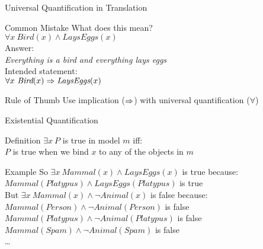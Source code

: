 \documentclass[14pt]{beamer}
\begin{document}
\begin{frame}{Universal Quantification in Translation}
	\begin{block}{Common Mistake}
		What does this mean? \\
		\tab$\forall x\ \textit{Bird}(x) \land \textit{LaysEggs}(x)$ \\
		\pause
		Answer: \\
		\tab\emph{Everything is a bird and everything lays eggs} \\
		Intended statement: \\
		\tab$\forall x\ \textit{Bird}(x) \Rightarrow \textit{LaysEggs}(x)$ \\
	\end{block}
	\pause
	\begin{block}{Rule of Thumb}
		Use implication ($\Rightarrow$) with universal quantification ($\forall$)
	\end{block}
\end{frame}
\begin{frame}{Existential Quantification}
	\begin{block}{Definition}
		$\exists x\ P$ is true in model $m$ iff: \\
		\tab$P$ is true when we bind $x$ to \alert{any} of the objects in $m$
	\end{block}
	\pause
	\begin{block}{Example}
		So $\exists x\ \textit{Mammal}(x) \land \textit{LaysEggs}(x)$ is true because: \\
		\pause
		\tab$\textit{Mammal}(\textit{Platypus}) \land \textit{LaysEggs}(\textit{Platypus})$ is true \\[.5em]
		\pause
		But $\exists x\ \textit{Mammal}(x) \land \lnot\textit{Animal}(x)$ is false because: \\
		\pause
		\tab$\textit{Mammal}(\textit{Person}) \land \lnot\textit{Animal}(\textit{Person})$ is false \\
		\tab$\textit{Mammal}(\textit{Platypus}) \land \lnot\textit{Animal}(\textit{Platypus})$ is false \\
		\tab$\textit{Mammal}(\textit{Spam}) \land \lnot\textit{Animal}(\textit{Spam})$ is false \\
		\tab\ldots \\
	\end{block}
\end{frame}
\end{document}
